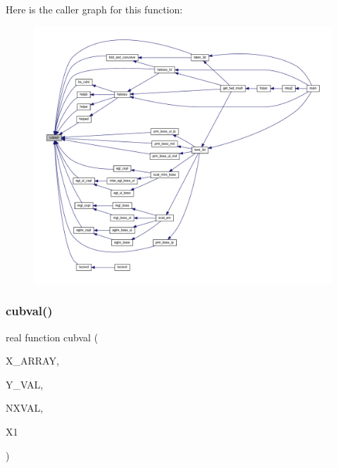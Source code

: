 Here is the caller graph for this function\+:\nopagebreak
\begin{figure}[H]
\begin{center}
\leavevmode
\includegraphics[width=350pt]{Leroi_8f90_a836d1cb8acb3544a3a9fa63433efc1b6_icgraph}
\end{center}
\end{figure}
\mbox{\label{Leroi_8f90_a7cfee47c046d9dadca7ccd1059bd30ac}} 
\subsubsection{\texorpdfstring{cubval()}{cubval()}}
{\footnotesize\ttfamily real function cubval (\begin{DoxyParamCaption}\item[{real, dimension(nxval), intent(in)}]{X\+\_\+\+A\+R\+R\+AY,  }\item[{real, dimension(4,nxval), intent(in)}]{Y\+\_\+\+V\+AL,  }\item[{integer, intent(in)}]{N\+X\+V\+AL,  }\item[{real, intent(in)}]{X1 }\end{DoxyParamCaption})}

